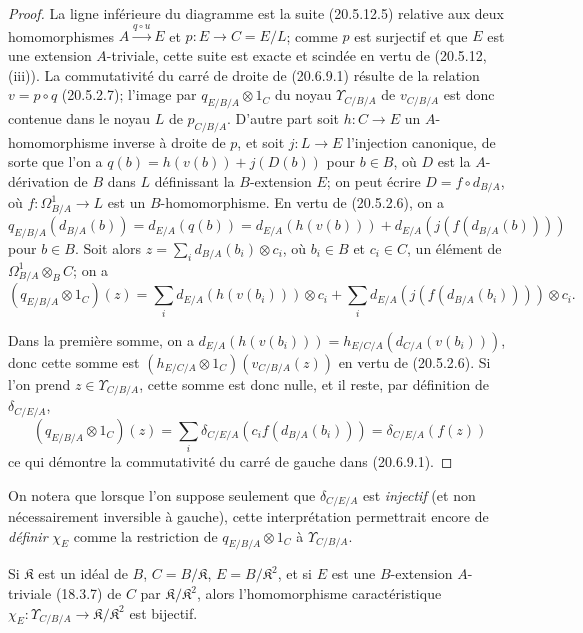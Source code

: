 \begin{proof}
La ligne inférieure du diagramme est la suite (20.5.12.5) relative aux
deux homomorphismes $A\xrightarrow{q\circ u}E$ et
$p:E\to C=E/L$; comme $p$ est surjectif et que $E$ est une extension
$A$-triviale, cette suite est exacte et scindée en vertu de (20.5.12,
(iii)). La commutativité du carré de droite de (20.6.9.1) résulte de la
relation $v=p\circ q$ (20.5.2.7); l'image par
$q_{E/B/A}\otimes1_C$ du noyau $\Upsilon_{C/B/A}$ de $v_{C/B/A}$ est
donc contenue dans le noyau $L$ de $p_{C/B/A}$. D'autre part soit
$h:C\to E$ un $A$-homomorphisme inverse à droite de $p$, et soit
$j:L\to E$ l'injection canonique, de sorte que l'on a
$q(b)=h(v(b))+j(D(b))$ pour $b\in B$, où $D$ est la $A$-dérivation de
$B$ dans $L$ définissant la $B$-extension $E$; on peut écrire
$D=f\circ d_{B/A}$, où $f:\Omega^1_{B/A}\to L$ est un
$B$-homomorphisme. En vertu de (20.5.2.6), on a
$q_{E/B/A}(d_{B/A}(b))=d_{E/A}(q(b))=d_{E/A}(h(v(b)))+d_{E/A}(j(f(d_{B/A}(b))))$
pour $b\in B$. Soit alors
$z=\sum_i d_{B/A}(b_i)\otimes c_i$, où $b_i\in B$ et $c_i\in C$, un
élément de $\Omega^1_{B/A}\otimes_B C$; on a
\[
  (q_{E/B/A}\otimes1_C)(z)=
  \sum_i d_{E/A}(h(v(b_i)))\otimes c_i+
  \sum_i d_{E/A}(j(f(d_{B/A}(b_i))))\otimes c_i.
\]

Dans la première somme, on a
$d_{E/A}(h(v(b_i)))=h_{E/C/A}(d_{C/A}(v(b_i)))$, donc cette somme est
$(h_{E/C/A}\otimes1_C)(v_{C/B/A}(z))$ en vertu de (20.5.2.6). Si l'on
prend $z\in\Upsilon_{C/B/A}$, cette somme est donc nulle, et il reste,
par définition de $\delta_{C/E/A}$,
\[
  (q_{E/B/A}\otimes1_C)(z)=
  \sum_i\delta_{C/E/A}(c_i f(d_{B/A}(b_i)))
  =\delta_{C/E/A}(f(z))
\]
ce qui démontre la commutativité du carré de gauche dans (20.6.9.1).
\end{proof}

On notera que lorsque l'on suppose seulement que $\delta_{C/E/A}$ est
\emph{injectif} (et non nécessairement inversible à gauche), cette
interprétation permettrait encore de \emph{définir} $\chi_E$ comme la
restriction de $q_{E/B/A}\otimes1_C$ à $\Upsilon_{C/B/A}$.

\begin{corollary}[20.6.10]
\label{0.20.6.10-fr}
Si $\mathfrak{K}$ est un idéal de $B$, $C=B/\mathfrak{K}$,
$E=B/\mathfrak{K}^2$, et si $E$ est une $B$-extension $A$-triviale
\textup{(18.3.7)} de $C$ par $\mathfrak{K}/\mathfrak{K}^2$, alors
l'homomorphisme caractéristique
$\chi_E:\Upsilon_{C/B/A}\to\mathfrak{K}/\mathfrak{K}^2$ est bijectif.
\end{corollary}

